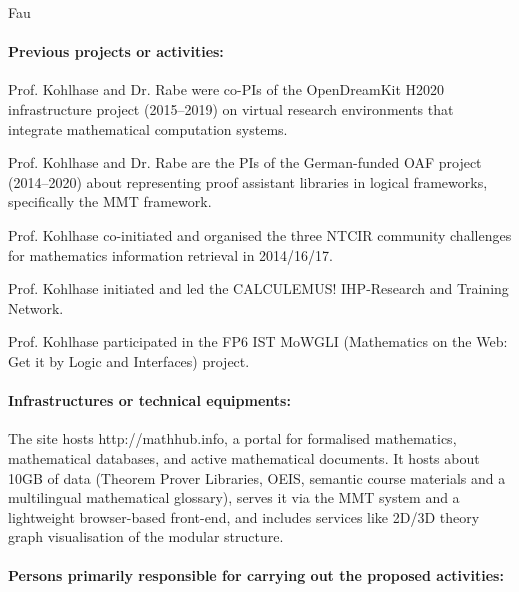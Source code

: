 \begin{sitedescription}{Fau}
\paragraph*{Previous projects or activities:}


\begin{compactitem}
 \item Prof. Kohlhase and Dr. Rabe were co-PIs of the OpenDreamKit H2020 infrastructure project (2015--2019) on virtual research environments that integrate mathematical computation systems.
 \item Prof. Kohlhase and Dr. Rabe are the PIs of the German-funded OAF project (2014--2020) about representing proof assistant libraries in logical frameworks, specifically the MMT framework.
 \item Prof. Kohlhase co-initiated and organised the three NTCIR community challenges for mathematics information retrieval in 2014/16/17.
 \item Prof. Kohlhase initiated and led the CALCULEMUS! IHP-Research and Training Network.
 \item Prof. Kohlhase participated in the FP6 IST MoWGLI (Mathematics on the Web: Get it by Logic and Interfaces) project.
\end{compactitem}

\paragraph*{Infrastructures or technical equipments:}

\begin{compactitem}
\item The site hosts http://mathhub.info, a portal for formalised mathematics, mathematical databases, and active mathematical documents.
It hosts about 10GB of data (Theorem Prover Libraries, OEIS, semantic course materials and a multilingual mathematical glossary), serves it via the MMT system and a lightweight browser-based front-end, and includes services like 2D/3D theory graph visualisation of the modular structure.
\end{compactitem}

\paragraph*{Persons primarily responsible for carrying out the proposed activities:}


\end{sitedescription}
